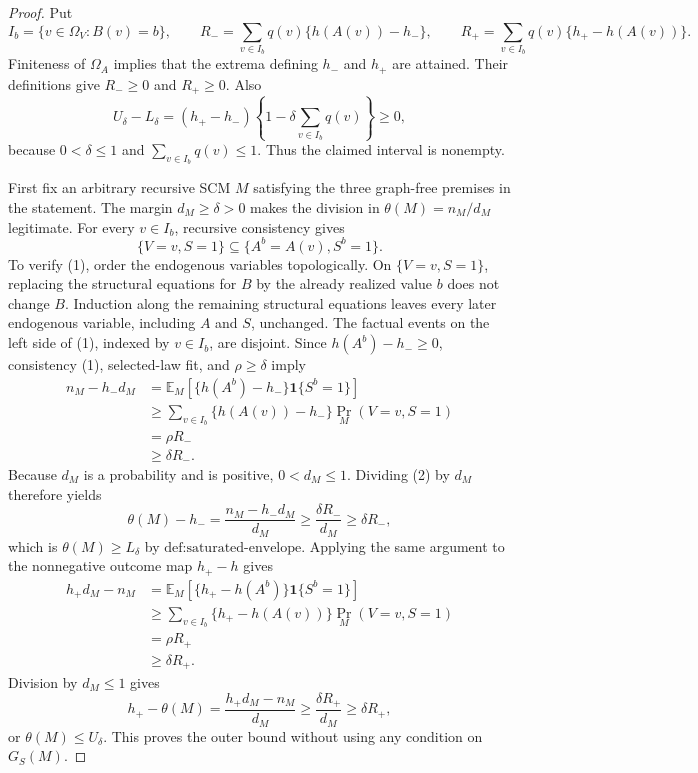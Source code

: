\documentclass{article}
\begin{document}
\begin{proof}
Put
\[
I_b=\{v\in\Omega_V:B(v)=b\},\qquad
R_- =\sum_{v\in I_b}q(v)\{h(A(v))-h_-\},\qquad
R_+ =\sum_{v\in I_b}q(v)\{h_+-h(A(v))\}.
\]
Finiteness of \(\Omega_A\) implies that the extrema defining \(h_-\) and \(h_+\) are attained.  Their definitions give \(R_-\geq0\) and \(R_+\geq0\).  Also
\[
U_\delta-L_\delta
=(h_+-h_-)\left\{1-\delta\sum_{v\in I_b}q(v)\right\}\geq0,
\]
because \(0<\delta\leq1\) and \(\sum_{v\in I_b}q(v)\leq1\).  Thus the claimed interval is nonempty.

First fix an arbitrary recursive SCM \(M\) satisfying the three graph-free premises in the statement.  The margin \(d_M\geq\delta>0\) makes the division in \(\theta(M)=n_M/d_M\) legitimate.  For every \(v\in I_b\), recursive consistency gives
\[
\{V=v,S=1\}\subseteq\{A^b=A(v),S^b=1\}. \tag{1}
\]
To verify (1), order the endogenous variables topologically.  On \(\{V=v,S=1\}\), replacing the structural equations for \(B\) by the already realized value \(b\) does not change \(B\).  Induction along the remaining structural equations leaves every later endogenous variable, including \(A\) and \(S\), unchanged.  The factual events on the left side of (1), indexed by \(v\in I_b\), are disjoint.  Since \(h(A^b)-h_-\geq0\), consistency (1), selected-law fit, and \(\rho\geq\delta\) imply
\[
\begin{aligned}
n_M-h_-d_M
&=\mathbb E_M\!\left[\{h(A^b)-h_-\}\mathbf 1\{S^b=1\}\right]\\
&\geq\sum_{v\in I_b}\{h(A(v))-h_-\}\Pr_M(V=v,S=1)\\
&=\rho R_-\\
&\geq\delta R_-.
\end{aligned} \tag{2}
\]
Because \(d_M\) is a probability and is positive, \(0<d_M\leq1\).  Dividing (2) by \(d_M\) therefore yields
\[
\theta(M)-h_-
=\frac{n_M-h_-d_M}{d_M}
\geq\frac{\delta R_-}{d_M}
\geq\delta R_-,
\]
which is \(\theta(M)\geq L_\delta\) by \(\text{def:saturated-envelope}\).  Applying the same argument to the nonnegative outcome map \(h_+-h\) gives
\[
\begin{aligned}
h_+d_M-n_M
&=\mathbb E_M\!\left[\{h_+-h(A^b)\}\mathbf 1\{S^b=1\}\right]\\
&\geq\sum_{v\in I_b}\{h_+-h(A(v))\}\Pr_M(V=v,S=1)\\
&=\rho R_+\\
&\geq\delta R_+.
\end{aligned} \tag{3}
\]
Division by \(d_M\leq1\) gives
\[
h_+-\theta(M)
=\frac{h_+d_M-n_M}{d_M}
\geq\frac{\delta R_+}{d_M}
\geq\delta R_+,
\]
or \(\theta(M)\leq U_\delta\).  This proves the outer bound without using any condition on \(G_S(M)\).


\end{proof}
\end{document}

